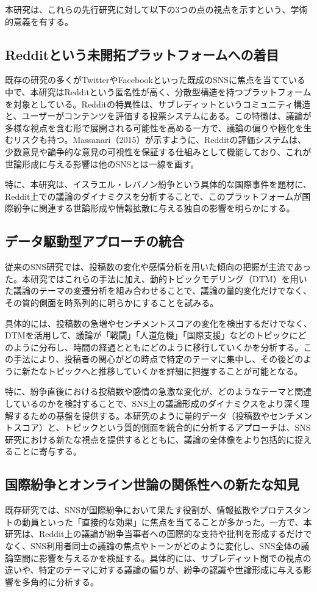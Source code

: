 \documentclass[11pt, a4j]{jreport}
\begin{document}
    本研究は、これらの先行研究に対して以下の3つの点の視点を示すという、学術的意義を有する。

    \subsection{Redditという未開拓プラットフォームへの着目}
    既存の研究の多くがTwitterやFacebookといった既成のSNSに焦点を当てている中で、本研究はRedditという匿名性が高く、分散型構造を持つプラットフォームを対象としている。Redditの特異性は、サブレディットというコミュニティ構造と、ユーザーがコンテンツを評価する投票システムにある。この特徴は、議論が多様な視点を含む形で展開される可能性を高める一方で、議論の偏りや極化を生むリスクも持つ。Massanari（2015）が示すように、Redditの評価システムは、少数意見や論争的な意見の可視性を保証する仕組みとして機能しており、これが世論形成に与える影響は他のSNSとは一線を画す。

    特に、本研究は、イスラエル・レバノン紛争という具体的な国際事件を題材に、Reddit上での議論のダイナミクスを分析することで、このプラットフォームが国際紛争に関連する世論形成や情報拡散に与える独自の影響を明らかにする。

    \subsection{データ駆動型アプローチの統合}
    従来のSNS研究では、投稿数の変化や感情分析を用いた傾向の把握が主流であった。本研究ではこれらの手法に加え、動的トピックモデリング（DTM）を用いた議論のテーマの変遷分析を組み合わせることで、議論の量的変化だけでなく、その質的側面を時系列的に明らかにすることを試みる。

    具体的には、投稿数の急増やセンチメントスコアの変化を検出するだけでなく、DTMを活用して、議論が「戦闘」「人道危機」「国際支援」などのトピックにどのように分布し、時間の経過とともにどのように移行していくかを分析する。この手法により、投稿者の関心がどの時点で特定のテーマに集中し、その後どのように新たなトピックへと推移していくかを詳細に把握することが可能となる。

    特に、紛争直後における投稿数や感情の急激な変化が、どのようなテーマと関連しているのかを検討することで、SNS上の議論形成のダイナミクスをより深く理解するための基盤を提供する。本研究のように量的データ（投稿数やセンチメントスコア）と、トピックという質的側面を統合的に分析するアプローチは、SNS研究における新たな視点を提供するとともに、議論の全体像をより包括的に捉えることに寄与する。

    \subsection{国際紛争とオンライン世論の関係性への新たな知見}
    既存研究では、SNSが国際紛争において果たす役割が、情報拡散やプロテスタントの動員といった「直接的な効果」に焦点を当てることが多かった。一方で、本研究は、Reddit上の議論が紛争当事者への国際的な支持や批判を形成するだけでなく、SNS利用者同士の議論の焦点やトーンがどのように変化し、SNS全体の議論空間に影響を与えるかを検証する。具体的には、サブレディット間での視点の違いや、特定のテーマに対する議論の偏りが、紛争の認識や世論形成に与える影響を多角的に分析する。
\end{document}
